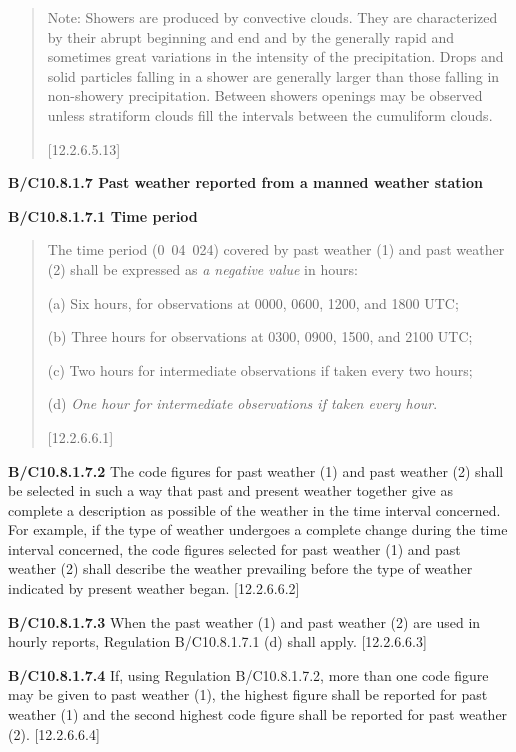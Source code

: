 \begin{quote}
Note: Showers are produced by convective clouds. They are characterized by their abrupt beginning and end and by the generally rapid and sometimes great variations in the intensity of the precipitation. Drops and solid particles falling in a shower are generally larger than those falling in non-showery precipitation. Between showers openings may be observed unless stratiform clouds fill the intervals between the cumuliform clouds.

{[}12.2.6.5.13{]}
\end{quote}

\textbf{B/C10.8.1.7 Past weather reported from a manned weather station}

\textbf{B/C10.8.1.7.1 Time period}

\begin{quote}
The time period (0~04~024) covered by past weather (1) and past weather (2) shall be expressed as \emph{a negative value} in hours:

(a) Six hours, for observations at 0000, 0600, 1200, and 1800 UTC;

(b) Three hours for observations at 0300, 0900, 1500, and 2100 UTC;

(c) Two hours for intermediate observations if taken every two hours;

(d) \emph{One hour for intermediate observations if taken every hour}.

{[}12.2.6.6.1{]}
\end{quote}

\textbf{B/C10.8.1.7.2} The code figures for past weather (1) and past weather (2) shall be selected in such a way that past and present weather together give as complete a description as possible of the weather in the time interval concerned. For example, if the type of weather undergoes a complete change during the time interval concerned, the code figures selected for past weather (1) and past weather (2) shall describe the weather prevailing before the type of weather indicated by present weather began. {[}12.2.6.6.2{]}

\textbf{B/C10.8.1.7.3} When the past weather (1) and past weather (2) are used in hourly reports, Regulation B/C10.8.1.7.1 (d) shall apply. {[}12.2.6.6.3{]}

\textbf{B/C10.8.1.7.4} If, using Regulation B/C10.8.1.7.2, more than one code figure may be given to past weather (1), the highest figure shall be reported for past weather (1) and the second highest code figure shall be reported for past weather (2). {[}12.2.6.6.4{]}

